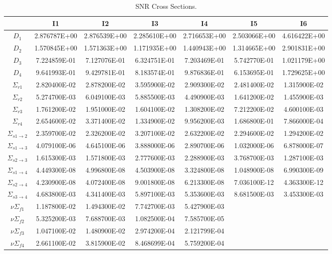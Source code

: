     \thispagestyle{lscapedplain}
    \begin{landscape}
    \begin{table}
      \caption{SNR Cross Sections.}
      \label{tab:snrxs}
      \begin{center}
        \begin{tabular}{ccccccc}
          \toprule
          &I1&I2&I3&I4&I5&I6\\
          \midrule
          $D_1$&2.876787E+00&2.876539E+00&2.285610E+00&2.716653E+00&2.503066E+00&4.616422E+00\\
          $D_2$&1.570845E+00&1.571363E+00&1.171935E+00&1.440943E+00&1.314665E+00&2.901831E+00\\
          $D_3$&7.224859E-01&7.127076E-01&6.324751E-01&7.203469E-01&5.742770E-01&1.021179E+00\\
          $D_4$&9.641993E-01&9.429781E-01&8.183574E-01&9.876836E-01&6.153695E-01&1.729625E+00\\
          $\Sigma_{r1}$&2.820400E-02&2.878200E-02&3.595900E-02&2.909300E-02&2.481400E-02&1.315900E-02\\
          $\Sigma_{r2}$&5.274700E-03&6.049100E-03&5.885500E-03&4.490900E-03&1.641200E-02&1.455900E-03\\
          $\Sigma_{r3}$&1.761200E-02&1.951000E-02&1.604100E-02&1.308200E-02&7.212200E-02&4.600100E-03\\
          $\Sigma_{r4}$&2.654600E-02&3.371400E-02&1.334900E-02&9.956200E-03&1.686800E-01&7.866000E-04\\
          $\Sigma_{s 1\rightarrow 2}$&2.359700E-02&2.326200E-02&3.207100E-02&2.632200E-02&2.294600E-02&1.294200E-02\\
          $\Sigma_{s 1\rightarrow 3}$&4.079100E-06&4.645100E-06&3.888000E-06&2.890700E-06&1.032000E-06&6.878000E-07\\
          $\Sigma_{s 2\rightarrow 3}$&1.615300E-03&1.571800E-03&2.777600E-03&2.288900E-03&3.768700E-03&1.287100E-03\\
          $\Sigma_{s 1\rightarrow 4}$&4.449300E-08&4.996800E-08&4.503900E-08&3.324800E-08&1.048900E-08&6.990300E-09\\
          $\Sigma_{s 2\rightarrow 4}$&4.230900E-08&4.072400E-08&9.001800E-08&6.213300E-08&7.036100E-12&4.363300E-12\\
          $\Sigma_{s 3\rightarrow 4}$&4.683800E-03&4.341400E-03&5.897100E-03&5.353600E-03&8.681500E-03&3.453300E-03\\
          $ \nu \Sigma_{f1}$&1.187800E-02&1.494300E-02&7.742700E-03&5.427900E-03&&\\
          $ \nu \Sigma_{f2}$&5.325200E-03&7.688700E-03&1.082500E-04&7.585700E-05&&\\
          $ \nu \Sigma_{f3}$&1.047100E-02&1.480900E-02&2.974200E-04&2.121799E-04&&\\
          $ \nu \Sigma_{f4}$&2.661100E-02&3.815900E-02&8.468699E-04&5.759200E-04&&\\
          \bottomrule
        \end{tabular}
      \end{center}
    \end{table}
    \end{landscape}

